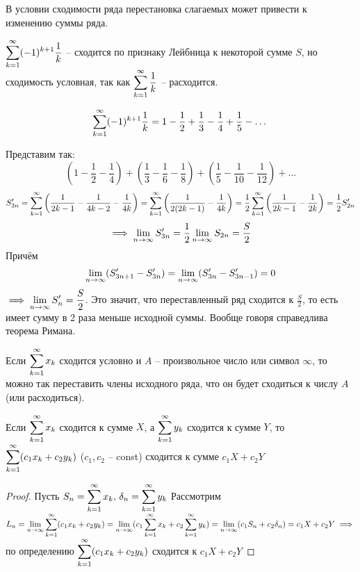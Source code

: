 \begin{remark}
    В условии сходимости ряда перестановка слагаемых может привести к
    изменению суммы ряда.

    $\displaystyle\sum_{k=1}^\infty (-1)^{k + 1} \frac{1}{k}$ -- сходится по признаку Лейбница к 
    некоторой сумме $S$, но сходимость условная, так как
    $\displaystyle\sum_{k=1}^\infty \frac{1}{k}$ -- расходится.

    \[ \displaystyle\sum_{k=1}^\infty (-1)^{k + 1} \frac{1}{k} 
    = 1 - \frac{1}{2} + \frac{1}{3} - \frac{1}{4} + \frac{1}{5} - \dots \]

    Представим так: 
    \[ 
        \left( 1 - \frac{1}{2} - \frac{1}{4} \right)
        + \left( \frac{1}{3} - \frac{1}{6} - \frac{1}{8} \right)
        + \left( \frac{1}{5} - \frac{1}{10} - \frac{1}{12} \right)
        + \dots
    \]
    \[
        S_{3n}' 
        = \displaystyle\sum_{k=1}^\infty \left( \frac{1}{2k - 1} - \frac{1}{4k-2} - \frac{1}{4k} \right)
        = \displaystyle\sum_{k=1}^\infty \left( \frac{1}{2 (2k - 1)} - \frac{1}{4k} \right)
        = \frac{1}{2} \displaystyle\sum_{k=1}^\infty \left( \frac{1}{2k - 1} - \frac{1}{2k} \right)
        = \frac{1}{2} S_{2n}'
    \]
    \[ \implies \displaystyle\lim_{n \to \infty} S_{3n}' = \frac{1}{2} \displaystyle\lim_{n \to \infty} S_{2n} = \frac{S}{2} \]
    Причём
    \[ \displaystyle\lim_{n \to \infty} (S_{3n + 1}' - S_{3n}') = \displaystyle\lim_{n \to \infty} (S_{3n}' - S_{3n - 1}') = 0 \]
    $\implies \displaystyle\lim_{n \to \infty} S_n' = \frac{S}{2}$. Это значит, что переставленный ряд
    сходится к $\frac{S}{2}$, то есть имеет сумму в 2 раза меньше исходной
    суммы. Вообще говоря справедлива теорема Римана.
\end{remark}

\begin{theorem}[Римана]
    Если $\displaystyle\sum_{k=1}^\infty x_k$ сходится условно и $A$ -- произвольное число или символ
    $\infty$, то можно так переставить члены исходного ряда, что он будет
    сходиться к числу $A$ (или расходиться).
\end{theorem}

\begin{theorem}
    Если $\displaystyle\sum_{k=1}^\infty x_k$ сходится к сумме $X$, а $\displaystyle\sum_{k=1}^\infty y_k$ сходится к сумме $Y$,
    то $\displaystyle\sum_{k=1}^\infty (c_1 x_k + c_2 y_k)$ ($c_1, c_2$ -- const) сходится к сумме
    $c_1 X + c_2 Y$
\end{theorem}
\begin{proof}
    Пусть $S_n = \displaystyle\sum_{k=1}^\infty x_k, \, \delta_n = \displaystyle\sum_{k=1}^\infty y_k$
    Рассмотрим $L_n = \displaystyle\lim_{n \to \infty} \displaystyle\sum_{k=1}^\infty (c_1 x_k + c_2 y_k) 
    = \displaystyle\lim_{n \to \infty} (c_1 \displaystyle\sum_{k=1}^\infty x_k + c_2 \displaystyle\sum_{k=1}^\infty y_k)
    = \displaystyle\lim_{n \to \infty} (c_1 S_n + c_2 \delta_n)
    = c_1 X + c_2 Y \implies$ по определению $\displaystyle\sum_{k=1}^\infty (c_1 x_k + c_2 y_k)$
    сходится к $c_1 X + c_2 Y$
\end{proof}

